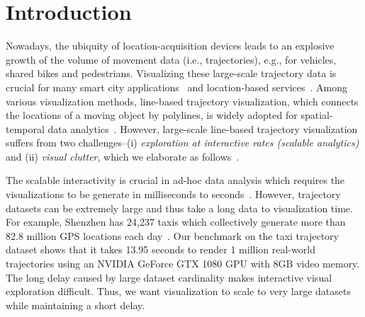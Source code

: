 \section{Introduction}\label{sec:intro}
Nowadays, the ubiquity of location-acquisition devices leads to an explosive growth of the volume of movement data (i.e., trajectories), e.g., for vehicles, shared bikes and pedestrians. Visualizing these large-scale trajectory data is crucial for many smart city applications~\cite{wang2014visual,tang2017efficient,zheng2011learning} and location-based services~\cite{liu2016smartadp, zheng2010collaborative}. Among various visualization methods, line-based trajectory visualization, which connects the locations of a moving object by polylines, is widely adopted for spatial-temporal data analytics~\cite{chen2015survey,visualanalysis,bigchanvis}. However, large-scale line-based trajectory visualization suffers from two challenges--(i) \textit{exploration at interactive rates (scalable analytics)} and (ii) \textit{visual clutter}, which we elaborate as follows~\cite{kwon2017sampling}.


The scalable interactivity is crucial in ad-hoc data analysis which requires the visualizations to be generate in milliseconds to seconds~\cite{shneiderman1984response}. However, trajectory datasets can be extremely large and thus take a long data to visualization time. For example, Shenzhen has 24,237 taxis which collectively generate more than 82.8 million GPS locations each day~\cite{sz}. Our benchmark on the \pt{} taxi trajectory dataset shows that it takes 13.95 seconds to render 1 million real-world trajectories using an NVIDIA GeForce GTX 1080 GPU with 8GB video memory. The long delay caused by large dataset cardinality makes interactive visual exploration difficult. Thus, we want visualization to scale to very large datasets while maintaining a short delay.

